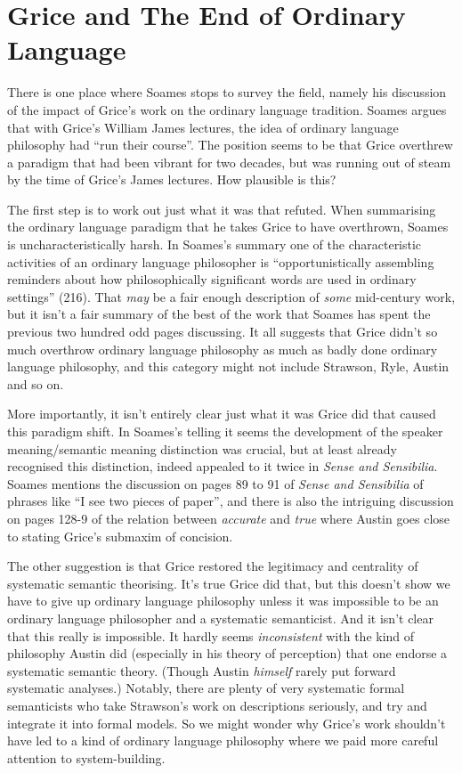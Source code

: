 \section{Grice and The End of Ordinary Language}

There is one place where Soames stops to survey the field, namely his discussion of the impact of Grice's work on the ordinary language tradition. Soames argues that with Grice's William James lectures, the idea of ordinary language philosophy had ``run their course''. The position seems to be that Grice overthrew a paradigm that had been vibrant for two decades, but was running out of steam by the time of Grice's James lectures. How plausible is this?

The first step is to work out just what it was that \citeauthor{Grice1989} refuted. When summarising the ordinary language paradigm that he takes Grice to have overthrown, Soames is uncharacteristically harsh. In Soames's summary one of the characteristic activities of an ordinary language philosopher is ``opportunistically assembling reminders about how philosophically significant words are used in ordinary settings'' (216). That \textit{may} be a fair enough description of \textit{some} mid-century work, but it isn't a fair summary of the best of the work that Soames has spent the previous two hundred odd pages discussing. It all suggests that Grice didn't so much overthrow ordinary language philosophy as much as badly done ordinary language philosophy, and this category might not include Strawson, Ryle, Austin and so on. 

More importantly, it isn't entirely clear just what it was Grice did that caused this paradigm shift. In Soames's telling it seems the development of the speaker meaning\slash sem\-antic meaning distinction was crucial, but \citeauthor{Austin1962} at least already recognised this distinction, indeed appealed to it twice in \textit{Sense and Sensibilia}. Soames mentions the discussion on pages 89 to 91 of \textit{Sense and Sensibilia} of phrases like ``I see two pieces of paper'', and there is also the intriguing discussion on pages 128-9 of the relation between \textit{accurate} and \textit{true} where Austin goes close to stating Grice's submaxim of concision. 

The other suggestion is that Grice restored the legitimacy and centrality of systematic semantic theorising. It's true Grice did that, but this doesn't show we have to give up ordinary language philosophy unless it was impossible to be an ordinary language philosopher and a systematic semanticist. And it isn't clear that this really is impossible. It hardly seems \textit{inconsistent} with the kind of philosophy Austin did (especially in his theory of perception) that one endorse a systematic semantic theory. (Though Austin \textit{himself} rarely put forward systematic analyses.) Notably, there are plenty of very systematic formal semanticists who take Strawson's work on descriptions seriously, and try and integrate it into formal models. So we might wonder why Grice's work shouldn't have led to a kind of ordinary language philosophy where we paid more careful attention to system-building.

